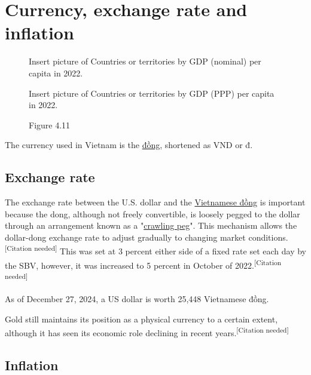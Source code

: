 \documentclass[openany]{book}
\begin{document}
\chapter{Currency, exchange rate and inflation}
\begin{figure}
    \vspace{-35pt}
    \begin{framed}
    
    Insert picture of Countries or territories by GDP (nominal) per capita in 2022.
    \caption*{Figure 4.10}
    \end{framed}
    
    \begin{framed}
    Insert picture of Countries or territories by GDP (PPP) per capita in 2022.
    \caption*{Figure 4.11}
    \end{framed}
    \vspace{-35pt}
\end{figure}


The currency used in Vietnam is the \href{https://en.wikipedia.org/wiki/%C4%90%E1%BB%93ng}{đồng}, shortened as VND or đ.    


\section{Exchange rate}

The exchange rate between the U.S. dollar and the \href{https://en.wikipedia.org/wiki/Vietnamese_%C4%91%E1%BB%93ng}{Vietnamese đồng} is important because the dong, although not freely convertible, is loosely pegged to the dollar through an arrangement known as a "\href{https://en.wikipedia.org/wiki/Crawling_peg}{crawling peg}". This mechanism allows the dollar-dong exchange rate to adjust gradually to changing market conditions.\textsuperscript{[Citation needed]} This was set at 3 percent either side of a fixed rate set each day by the SBV, however, it was increased to 5 percent in October of 2022.\textsuperscript{[Citation needed]}

As of December 27, 2024, a US dollar is worth 25,448 Vietnamese đồng.

Gold still maintains its position as a physical currency to a certain extent, although it has seen its economic role declining in recent years.\textsuperscript{[Citation needed]}
\clearpage
\section{Inflation}
\end{document}
